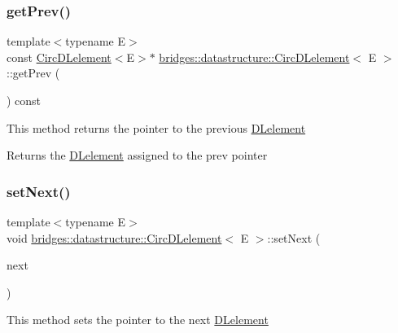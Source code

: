\subsubsection{\texorpdfstring{get\+Prev()}{getPrev()}}
{\footnotesize\ttfamily template$<$typename E$>$ \\
const \mbox{\hyperlink{classbridges_1_1datastructure_1_1_circ_d_lelement}{Circ\+D\+Lelement}}$<$E$>$$\ast$ \mbox{\hyperlink{classbridges_1_1datastructure_1_1_circ_d_lelement}{bridges\+::datastructure\+::\+Circ\+D\+Lelement}}$<$ E $>$\+::get\+Prev (\begin{DoxyParamCaption}{ }\end{DoxyParamCaption}) const\hspace{0.3cm}{\ttfamily [inline]}}

This method returns the pointer to the previous \mbox{\hyperlink{classbridges_1_1datastructure_1_1_d_lelement}{D\+Lelement}} \begin{DoxyReturn}{Returns}
the \mbox{\hyperlink{classbridges_1_1datastructure_1_1_d_lelement}{D\+Lelement}} assigned to the prev pointer 
\end{DoxyReturn}
\mbox{\label{classbridges_1_1datastructure_1_1_circ_d_lelement_aa19f430c7b00a6d38187021255f741e4}} 
\subsubsection{\texorpdfstring{set\+Next()}{setNext()}}
{\footnotesize\ttfamily template$<$typename E$>$ \\
void \mbox{\hyperlink{classbridges_1_1datastructure_1_1_circ_d_lelement}{bridges\+::datastructure\+::\+Circ\+D\+Lelement}}$<$ E $>$\+::set\+Next (\begin{DoxyParamCaption}\item[{\mbox{\hyperlink{classbridges_1_1datastructure_1_1_circ_d_lelement}{Circ\+D\+Lelement}}$<$ E $>$ $\ast$}]{next }\end{DoxyParamCaption})\hspace{0.3cm}{\ttfamily [inline]}}

This method sets the pointer to the next \mbox{\hyperlink{classbridges_1_1datastructure_1_1_d_lelement}{D\+Lelement}}


